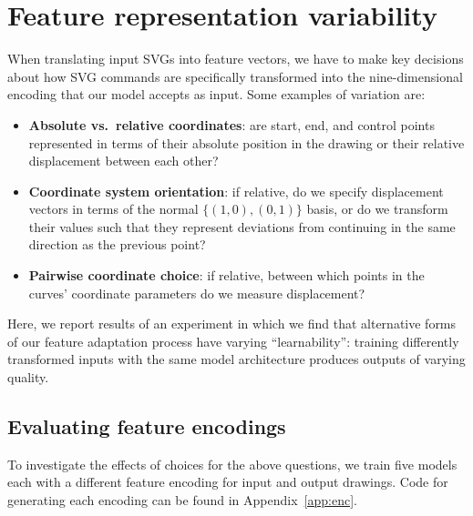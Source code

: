 \chapter{Feature representation variability}\label{chap:feature-variation}
When translating input SVGs into feature vectors, we have to make key decisions about how SVG commands are specifically transformed into the nine-dimensional encoding that our model accepts as input.
Some examples of variation are:

\begin{itemize}
\item \textbf{Absolute vs.\ relative coordinates}: are start, end, and control points represented in terms of their absolute position in the drawing or their relative displacement between each other?
\item \textbf{Coordinate system orientation}: if relative, do we specify displacement vectors in terms of the normal $\{(1, 0), (0, 1)\}$ basis, or do we transform their values such that they represent deviations from continuing in the same direction as the previous point?
\item \textbf{Pairwise coordinate choice}: if relative, between which points in the curves' coordinate parameters do we measure displacement?
\end{itemize}

Here, we report results of an experiment in which we find that alternative forms of our feature adaptation process have varying ``learnability'': training differently transformed inputs with the same model architecture produces outputs of varying quality.

\section{Evaluating feature encodings}\label{sec:eval-encs}
To investigate the effects of choices for the above questions, we train five models each with a different feature encoding for input and output drawings.
Code for generating each encoding can be found in Appendix~\ref{app:enc}.

